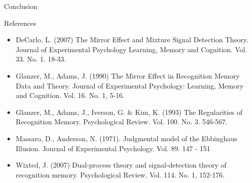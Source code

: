 \documentclass[final]{beamer}
\newlength{\onecolwid}
\begin{document}
\begin{frame}[t]
\begin{columns}[t]
\begin{column}{\onecolwid}
\begin{alertblock}{Conclusion}
\end{alertblock}


\begin{alertblock}{References}

\begin{itemize}
\item DeCarlo, L. (2007) The Mirror Effect and Mixture Signal Detection Theory. Journal of Experimental Psychology\: Learning, Memory and Cognition. Vol. 33. No. 1. 18-33.
\item Glanzer, M., Adams, J. (1990) The Mirror Effect in Recognition Memory \: Data and Theory. Journal of Experimental Psychology: Learning, Memory and Cognition. Vol. 16. No. 1, 5-16.
\item Glanzer, M., Adams, J., Iverson, G. \& Kim, K. (1993) The Regularities of Recognition Memory. Psychological Review. Vol. 100. No. 3. 546-567.
\item Massaro, D., Anderson, N. (1971). Judgmental model of the Ebbinghaus Illusion. Journal of Experimental Psychology. Vol. 89. 147 - 151
\item Wixted, J. (2007) Dual-process theory and signal-detection theory of recognition memory. Psychological Review. Vol. 114. No. 1, 152-176.
\end{itemize}

\nocite{*} %
\small{
\vspace{0.75in}}

\end{alertblock}




\end{column}
\end{columns}
\end{frame}
\end{document}

